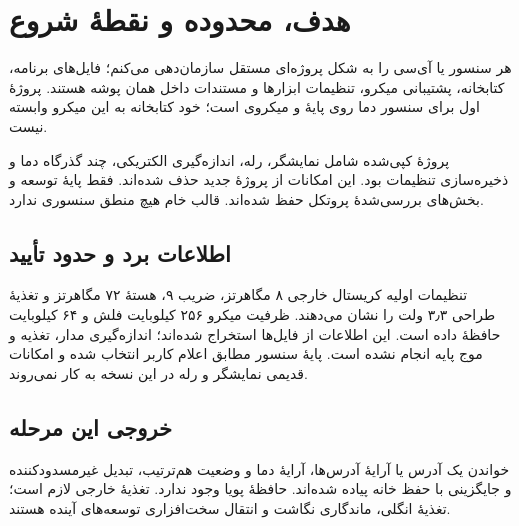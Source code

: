\section{هدف، محدوده و نقطهٔ شروع}
هر سنسور یا آی‌سی را به شکل پروژه‌ای مستقل سازمان‌دهی می‌کنم؛ فایل‌های برنامه،
کتابخانه، پشتیبانی میکرو، تنظیمات ابزارها و مستندات داخل همان پوشه هستند.
پروژهٔ اول برای سنسور دما روی پایهٔ
و میکروی
است؛ خود کتابخانه به این میکرو وابسته نیست.

پروژهٔ کپی‌شده شامل نمایشگر، رله، اندازه‌گیری الکتریکی، چند گذرگاه دما و
ذخیره‌سازی تنظیمات بود. این امکانات از پروژهٔ جدید حذف شده‌اند. فقط پایهٔ
توسعه و بخش‌های بررسی‌شدهٔ پروتکل حفظ شده‌اند. قالب خام هیچ منطق سنسوری ندارد.

\subsection{اطلاعات برد و حدود تأیید}
تنظیمات اولیه کریستال خارجی ۸ مگاهرتز، ضریب ۹، هستهٔ ۷۲ مگاهرتز و تغذیهٔ
طراحی ۳٫۳ ولت را نشان می‌دهند. ظرفیت میکرو ۲۵۶ کیلوبایت فلش و ۶۴ کیلوبایت
حافظهٔ داده است.
\cite{stm32}
این اطلاعات از فایل‌ها استخراج شده‌اند؛ اندازه‌گیری مدار، تغذیه و موج پایه
انجام نشده است. پایهٔ سنسور مطابق اعلام کاربر انتخاب شده و امکانات قدیمی
نمایشگر و رله در این نسخه به کار نمی‌روند.

\subsection{خروجی این مرحله}
خواندن یک آدرس یا آرایهٔ آدرس‌ها، آرایهٔ دما و وضعیت هم‌ترتیب، تبدیل غیرمسدودکننده
و جایگزینی با حفظ خانه پیاده شده‌اند. حافظهٔ پویا وجود ندارد. تغذیهٔ خارجی
لازم است؛ تغذیهٔ انگلی، ماندگاری نگاشت و انتقال سخت‌افزاری توسعه‌های آینده هستند.
